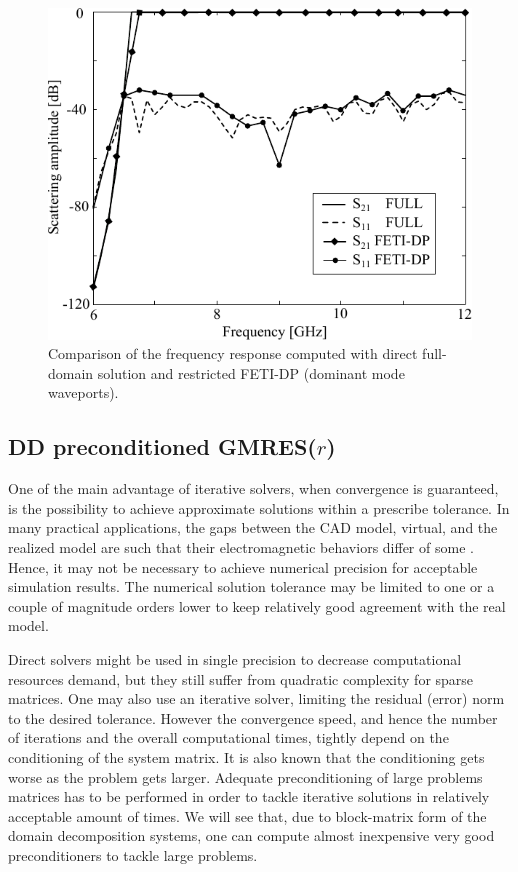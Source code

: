 \begin{figure}[h!]
\centering
\includegraphics[width=13.4cm]{WRfreqFETI}
\caption{Comparison of the frequency response computed with direct full-domain solution and restricted FETI-DP (dominant mode waveports).}
\label{fig:WRfreqFETI}
\end{figure}
\clearpage

\subsection{\texorpdfstring{DD preconditioned GMRES($r$)}{DD preconditioned GMRES(r)}}

One of the main advantage of iterative solvers, when convergence is guaranteed, is the possibility to achieve approximate solutions within a prescribe tolerance. In many practical applications, the gaps between the CAD model, virtual, and the realized model are such that their electromagnetic behaviors differ of some . Hence, it may not be necessary to achieve numerical precision for acceptable simulation results. The numerical solution tolerance may be limited to one or a couple of magnitude orders lower to keep relatively good agreement with the real model.

Direct solvers might be used in single precision to decrease computational resources demand, but they still suffer from quadratic complexity for sparse matrices. One may also use an iterative solver, limiting the residual (error) norm to the desired tolerance. However the convergence speed, and hence the number of iterations and the overall computational times, tightly depend on the conditioning of the system matrix. It is also known that the conditioning gets worse as the problem gets larger. Adequate preconditioning of large problems matrices has to be performed in order to tackle iterative solutions in relatively acceptable amount of times. We will see that, due to block-matrix form of the domain decomposition systems, one can compute almost inexpensive very good preconditioners to tackle large problems.

